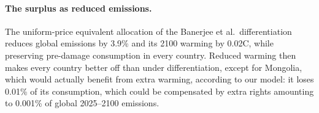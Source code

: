\documentclass[12pt,english]{article}
\theoremstyle{remark}
\begin{document}
\paragraph{The surplus as reduced emissions.} The uniform-price equivalent allocation of the Banerjee et al.\ differentiation reduces global emissions by 3.9\% and its 2100 warming by 0.02\textdegree C, while preserving pre-damage consumption in every country. %
Reduced warming then makes every country better off than under differentiation, except for Mongolia, which would actually benefit from extra warming, according to our model: %
it loses 0.01\% of its consumption, which could be compensated by extra rights amounting to 0.001\% of global 2025--2100 emissions. %
\end{document}
